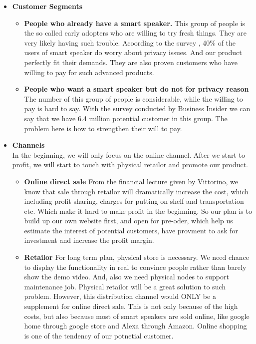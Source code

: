 \documentclass[12pt,twoside]{article}
\begin{document}
\begin{itemize}
\item \textbf{Customer Segments}\\
\begin{itemize}
    \item \textbf{People who already have a smart speaker.} This group of people is the so called early adopters who are willing to try fresh things. They are very 
    likely having such trouble. Acoording to the survey \cite{amountsmartassistant}, 40\% of the users of smart speaker do worry about privacy issues. And our 
    product perfectly fit their demands. They are also proven customers who have willing to pay for such advanced products.
    \item \textbf{People who want a smart speaker but do not for privacy reason} The number of this group of people is considerable, while the willing to pay is 
    hard to say. With the survey \cite{privacyfear} conducted by Business Insider we can say that we have 6.4 million potential customer in this group. The problem 
    here is how to strengthen their will to pay.
\end{itemize}

\item \textbf{Channels}\\
In the beginning, we will only focus on the online channel. After we start to profit, we will start to touch with physical retailor and promote our product.
\begin{itemize}
    \item \textbf{Online direct sale} From the financial lecture given by Vittorino, we know that sale through retailor will dramatically increase the cost, which 
    including profit sharing, charges for putting on shelf and transportation etc. Which make it hard to make profit in the beginning. So our plan is to build up our 
    own website first, and open for pre-oder, which help us estimate the interest of potential customers, have provment to ask for investment and increase the profit 
    margin.
    \item \textbf{Retailor} For long term plan, physical store is necessary. We need chance to display the functionality in real to convince people rather than barely
    show the demo video. And, also we need physical nodes to support maintenance job. Physical retailor will be a great solution to such problem. However, this 
    distribution channel would ONLY be a supplement for online direct sale. This is not only because of the high costs, but also because most of smart speakers are sold
    online, like google home through google store and Alexa through Amazon. Online shopping is one of the tendency of our potnetial customer. 
\end{itemize}


\end{itemize}
\end{document}
